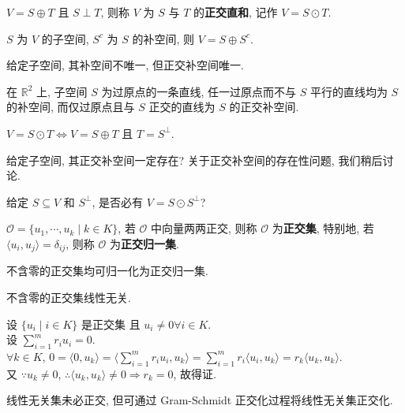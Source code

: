 \documentclass{note}
\begin{document}
\begin{df}[正交直和]
    $V=S\oplus T$ 且 $S\perp T$, 则称 $V$ 为 $S$ 与 $T$ 的\textbf{正交直和}, 记作 $V=S\odot T$.
\end{df}

$S$ 为 $V$ 的子空间, $S^c$ 为 $S$ 的补空间, 则 $V=S\oplus S^c$.

给定子空间, 其补空间不唯一, 但正交补空间唯一.

\begin{eg}
    在 $\mathbb{R}^2$ 上, 子空间 $S$ 为过原点的一条直线, 任一过原点而不与 $S$ 平行的直线均为 $S$ 的补空间, 而仅过原点且与 $S$ 正交的直线为 $S$ 的正交补空间.
\end{eg}

\begin{thm}
    $V=S\odot T\Longleftrightarrow V=S\oplus T$ 且 $T=S^{\perp}$.
\end{thm}

给定子空间, 其正交补空间一定存在? 关于正交补空间的存在性问题, 我们稍后讨论.

给定 $S\subseteq V$ 和 $S^{\perp}$, 是否必有 $V=S\odot S^{\perp}$?

\begin{df}[正交(归一)集]
    $\mathcal{O}=\{u_1,\cdots,u_k\mid k\in K\}$, 若 $\mathcal{O}$ 中向量两两正交, 则称 $\mathcal{O}$ 为\textbf{正交集}, 特别地, 若 $\langle u_i,u_j\rangle=\delta_{ij}$, 则称 $\mathcal{O}$ 为\textbf{正交归一集}.
\end{df}

不含零的正交集均可归一化为正交归一集.

\begin{thm}[(课本定理 9.8)]
    不含零的正交集线性无关.
\end{thm}
\begin{pf}
    设 $\{u_i\mid i\in K\}$ 是正交集 且 $u_i\neq 0\forall i\in K$.\\
    设 $\sum_{i=1}^mr_iu_i=0$.\\
    $\forall k\in K$, $0=\langle 0,u_k\rangle=\langle\sum_{i=1}^mr_iu_i,u_k\rangle=\sum_{i=1}^mr_i\langle u_i,u_k\rangle=r_k\langle u_k,u_k\rangle$.\\
    又 $\because u_k\neq 0$, $\therefore\langle u_k,u_k\rangle\neq 0\Longrightarrow r_k=0$, 故得证.
\end{pf}

线性无关集未必正交, 但可通过 Gram-Schmidt 正交化过程将线性无关集正交化.
\end{document}
